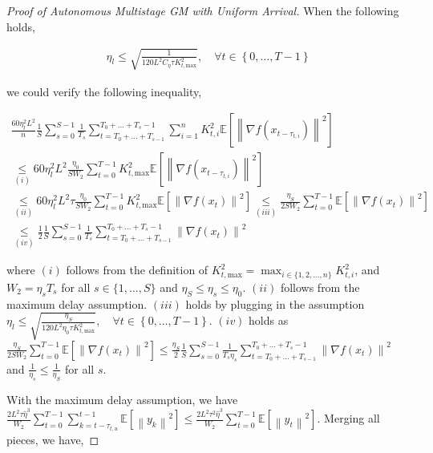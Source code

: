 \begin{proof}[Proof of Autonomous Multistage GM with Uniform Arrival]
When the following holds, 

\begin{equation}
\begin{gathered}
\eta_l \leq \sqrt{\frac{1}{ 120L^2 C_\eta \tau K_{t,\text{max}}^2}}, \quad  \forall t \in \left\{0,\dots,T-1\right\}
\end{gathered}\nonumber
\end{equation}

we could verify the following inequality,

\begin{equation}
\begin{gathered}
\frac{60 \eta_l^2 L^2}{n} \frac{1}{S}\sum_{s=0}^{S-1} \frac{1}{T_s}\sum_{t=T_0+\dots+T_{s-1} }^{T_0+\dots+T_s-1} \sum_{i=1}^n K_{t,i}^2\mathbb{E}\left[\left\| \nabla f(x_{t-\tau_{t,i}})\right\|^2\right] \\ 
\underset{(i)}{\leq} 60 \eta_l^2 L^2  \frac{\eta_0}{SW_2} \sum_{t=0}^{T-1} K_{t,\text{max}}^2 \mathbb{E}\left[\left\| \nabla f(x_{t-\tau_{t,i}})\right\|^2\right]\\
\underset{(ii)}{\leq} 60 \eta_l^2 L^2 \tau  \frac{\eta_0}{SW_2} \sum_{t=0}^{T-1} K_{t,\text{max}}^2 \mathbb{E}\left[\left\| \nabla f(x_{t})\right\|^2\right] \underset{(iii)}{\leq} \frac{\eta_S}{2 S W_2} \sum_{t=0}^{T-1} \mathbb{E}\left[\left\| \nabla f(x_{t})\right\|^2\right]\\
\underset{(iv)}{\leq} \frac{1}{2}\frac{1}{S}\sum_{s=0}^{S-1} \frac{1}{T_s}\sum_{t=T_0+\dots+T_{s-1} }^{T_0+\dots+T_s-1} \left\|\nabla f(x_t)\right\|^2
\end{gathered}\nonumber
\end{equation}

where $(i)$ follows from the definition of $K_{t,\text{max}}^2=\max_{i\in\{1,2,\dots,n\}}K_{t,i}^2$, and $W_2=\eta_s T_s$ for all $s\in\{1,\dots,S\}$ and $\eta_S \leq \eta_s \leq \eta_0$. $(ii)$ follows from the maximum delay assumption. $(iii)$ holds by plugging in the assumption $\eta_l \leq \sqrt{\frac{\eta_S}{ 120L^2 \eta_0 \tau K_{t,\text{max}}^2}}, \quad  \forall t \in \left\{0,\dots,T-1\right\}$. $(iv)$ holds as $\frac{\eta_S}{2 S W_2} \sum_{t=0}^{T-1} \mathbb{E}\left[\left\| \nabla f(x_{t})\right\|^2\right] \leq \frac{\eta_S}{2}\frac{1}{S}\sum_{s=0}^{S-1} \frac{1}{T_s \eta_s}\sum_{t=T_0+\dots+T_{s-1} }^{T_0+\dots+T_s-1} \left\|\nabla f(x_t)\right\|^2$ and $\frac{1}{\eta_s}\leq\frac{1}{\eta_S}$ for all $s$.


With the maximum delay assumption, we have $\frac{2 L^2 \tau \hat{\eta}^3}{W_2} \sum_{t=0}^{T-1} \sum_{k=t-\tau_{t,u}}^{t-1}\mathbb{E}\left[\left\|  y_k \right\|^2\right]\leq \frac{2 L^2 \tau^2 \hat{\eta}^3}{W_2} \sum_{t=0}^{T-1}\mathbb{E}\left[\left\|  y_t \right\|^2\right]$. Merging all pieces, we have,


\end{proof}
